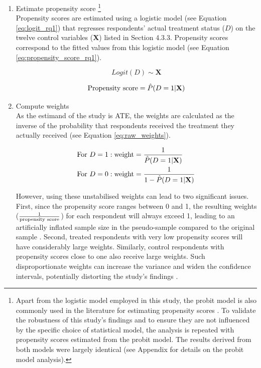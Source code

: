 \begin{enumerate}[wide=0pt, leftmargin=*, labelwidth=0pt, labelindent=\parindent, itemindent=0pt]
    \item Estimate propensity score \footnote{Apart from the logistic model employed in this study, the probit model is also commonly used in the literature for estimating propensity scores \parencite{abadie_matching_2016}. To validate the robustness of this study's findings and to ensure they are not influenced by the specific choice of statistical model, the analysis is repeated with propensity scores estimated from the probit model. The results derived from both models were largely identical (see Appendix for details on the probit model analysis).} \\
    Propensity scores are estimated using a logistic model (see Equation \ref{eq:logit_rq1}) that regresses respondents' actual treatment status ($D$) on the twelve control variables (\textbf{X}) listed in Section 4.3.3. Propensity scores correspond to the fitted values from this logistic model (see Equation \ref{eq:propensity_score_rq1}).

    \begin{equation}
        \label{eq:logit_rq1}
        Logit(D) \sim \textbf{X}
    \end{equation}

    \begin{equation}
        \label{eq:propensity_score_rq1}
        \textnormal{Propensity score} = \hat{P}(D = 1 | \textbf{X})
    \end{equation}

    \item Compute weights \\
    As the estimand of the study is ATE, the weights are calculated as the inverse of the probability that respondents received the treatment they actually received (see Equation \ref{eq:raw_weights}).

    \begin{equation}
        \label{eq:raw_weights}
        \begin{aligned}
            \textnormal{For } D &= 1: \textnormal{weight} = \frac{1}{\hat{P}(D = 1 | \textbf{X})} \\
            \textnormal{For } D &= 0: \textnormal{weight} = \frac{1}{1 - \hat{P}(D = 1 | \textbf{X})}
        \end{aligned}
    \end{equation}

    However, using these unstabilised weights can lead to two significant issues. First, since the propensity score ranges between 0 and 1, the resulting weights ($\frac{1}{\textnormal{propensity score}}$) for each respondent will always exceed 1, leading to an artificially inflated sample size in the pseudo-sample compared to the original sample \parencite[p. 413]{morgan_counterfactuals_2014}. Second, treated respondents with very low propensity scores will have considerably large weights. Similarly, control respondents with propensity scores close to one also receive large weights. Such disproportionate weights can increase the variance and widen the confidence intervals, potentially distorting the study's findings \parencite{cole_constructing_2008}.


\end{enumerate}
